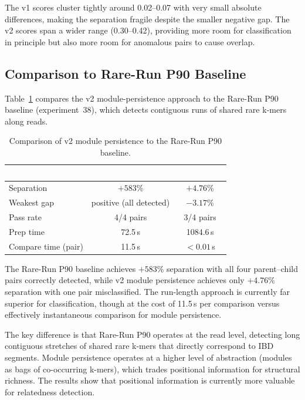\documentclass{../yalumba}
\begin{document}
The v1 scores cluster tightly around 0.02--0.07 with very small absolute
differences, making the separation fragile despite the smaller negative gap.
The v2 scores span a wider range (0.30--0.42), providing more room for
classification in principle but also more room for anomalous pairs to cause
overlap.

\subsection{Comparison to Rare-Run P90 Baseline}

Table~\ref{tab:baseline} compares the v2 module-persistence approach to the
Rare-Run P90 baseline (experiment~38), which detects contiguous runs of shared
rare k-mers along reads.

\begin{table}[htbp]
\centering
\tablestyle
\caption{Comparison of v2 module persistence to the Rare-Run P90 baseline.}
\label{tab:baseline}
\begin{tabular}{@{}lcc@{}}
\toprule
\rowcolor{table-header}
\textcolor{white}{\textbf{Metric}} &
\textcolor{white}{\textbf{Rare-Run P90}} &
\textcolor{white}{\textbf{v2 Module}} \\
\midrule
Separation          & $+583\%$  & $+4.76\%$  \\
Weakest gap         & positive (all detected) & $-3.17\%$ \\
Pass rate           & 4/4 pairs & 3/4 pairs  \\
Prep time           & 72.5\,s   & 1084.6\,s  \\
Compare time (pair) & 11.5\,s   & $<0.01$\,s \\
\bottomrule
\end{tabular}
\end{table}

\begin{limitation}
The Rare-Run P90 baseline achieves $+583\%$ separation with all four
parent--child pairs correctly detected, while v2 module persistence achieves
only $+4.76\%$ separation with one pair misclassified.  The run-length
approach is currently far superior for classification, though at the cost
of 11.5\,s per comparison versus effectively instantaneous comparison for
module persistence.
\end{limitation}

The key difference is that Rare-Run P90 operates at the read level, detecting
long contiguous stretches of shared rare k-mers that directly correspond to
IBD segments.  Module persistence operates at a higher level of abstraction
(modules as bags of co-occurring k-mers), which trades positional information
for structural richness.  The results show that positional information is
currently more valuable for relatedness detection.
\end{document}
